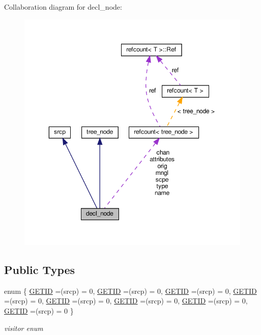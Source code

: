 Collaboration diagram for decl\+\_\+node\+:
\nopagebreak
\begin{figure}[H]
\begin{center}
\leavevmode
\includegraphics[width=350pt]{d7/d9c/structdecl__node__coll__graph}
\end{center}
\end{figure}
\subsection*{Public Types}
\begin{DoxyCompactItemize}
\item 
enum \{ \newline
\hyperlink{structdecl__node_a7d7ab7893f21527db576f4ef976365a3a5a9eacd105de8a0d66c9dd9a4145ee52}{G\+E\+T\+ID} =(srcp) = 0, 
\hyperlink{structdecl__node_a7d7ab7893f21527db576f4ef976365a3a5a9eacd105de8a0d66c9dd9a4145ee52}{G\+E\+T\+ID} =(srcp) = 0, 
\hyperlink{structdecl__node_a7d7ab7893f21527db576f4ef976365a3a5a9eacd105de8a0d66c9dd9a4145ee52}{G\+E\+T\+ID} =(srcp) = 0, 
\hyperlink{structdecl__node_a7d7ab7893f21527db576f4ef976365a3a5a9eacd105de8a0d66c9dd9a4145ee52}{G\+E\+T\+ID} =(srcp) = 0, 
\newline
\hyperlink{structdecl__node_a7d7ab7893f21527db576f4ef976365a3a5a9eacd105de8a0d66c9dd9a4145ee52}{G\+E\+T\+ID} =(srcp) = 0, 
\hyperlink{structdecl__node_a7d7ab7893f21527db576f4ef976365a3a5a9eacd105de8a0d66c9dd9a4145ee52}{G\+E\+T\+ID} =(srcp) = 0, 
\hyperlink{structdecl__node_a7d7ab7893f21527db576f4ef976365a3a5a9eacd105de8a0d66c9dd9a4145ee52}{G\+E\+T\+ID} =(srcp) = 0, 
\hyperlink{structdecl__node_a7d7ab7893f21527db576f4ef976365a3a5a9eacd105de8a0d66c9dd9a4145ee52}{G\+E\+T\+ID} =(srcp) = 0
 \}\begin{DoxyCompactList}\small\item\em visitor enum \end{DoxyCompactList}
\end{DoxyCompactItemize}
